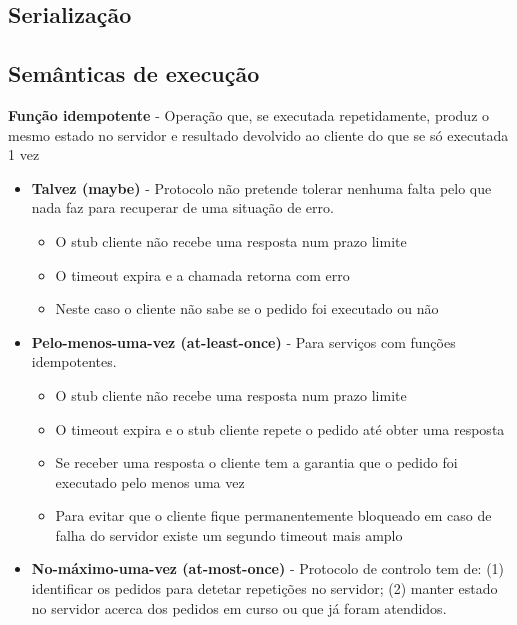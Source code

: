 \documentclass[12pt]{article}
\begin{document}
\subsection{Serialização}

\newpage

\subsection{Semânticas de execução}

\textbf{Função idempotente} - Operação que, se executada repetidamente, produz o mesmo estado no servidor e resultado devolvido ao cliente do que se só executada 1 vez

\begin{itemize}
    \item \textbf{Talvez (maybe)} - Protocolo não pretende tolerar nenhuma falta pelo que nada faz para recuperar de uma situação de erro.
    \begin{itemize}[topsep=0pt, itemsep=0pt]
        \item O stub cliente não recebe uma resposta num prazo limite
        \item O timeout expira e a chamada retorna com erro
        \item Neste caso o cliente não sabe se o pedido foi executado ou não
    \end{itemize}
    \item \textbf{Pelo-menos-uma-vez (at-least-once)} - Para serviços com funções idempotentes.
    \begin{itemize}[topsep=0pt, itemsep=0pt]
        \item O stub cliente não recebe uma resposta num prazo limite
        \item O timeout expira e o stub cliente repete o pedido até obter uma resposta
        \item Se receber uma resposta o cliente tem a garantia que o pedido foi executado pelo menos uma vez
        \item Para evitar que o cliente fique permanentemente bloqueado em caso de falha do servidor existe um segundo timeout mais amplo
    \end{itemize}
    \item \textbf{No-máximo-uma-vez (at-most-once)} - Protocolo de controlo tem de: (1) identificar os pedidos para detetar repetições no servidor; (2) manter estado no servidor acerca dos pedidos em curso ou que já foram atendidos.
    \begin{itemize}[topsep=0pt, itemsep=0pt]

\end{itemize}
\end{itemize}
\end{document}
